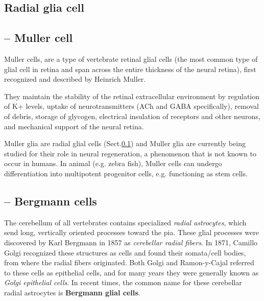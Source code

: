 \subsection{Radial glia cell}
\label{sec:Radial-glial}



\subsection{-- Muller cell}
\label{sec:Muller-cell}

 Muller cells, are a type of vertebrate retinal glial cells (the most common
 type of glial cell in retina and span across the entire thickness of the neural
 retina), first recognized and described by Heinrich Muller.
 
They maintain the stability of the retinal extracellular environment by
regulation of K+ levels, uptake of neurotransmitters (ACh and GABA
specifically), removal of debris, storage of glycogen, electrical insulation of
receptors and other neurons, and mechanical  support of the neural retina.

Muller glia are radial glial cells (Sect.\ref{sec:Radial-glial}) and Muller glia
are currently being studied for their role in neural regeneration, a phenomenon
that is not known to occur in humans. In animal (e.g. zebra fish), Muller cells
can undergo differentiation into multipotent progenitor cells, e.g.
functioning as stem cells.

\subsection{-- Bergmann cells}
\label{sec:Bergmann-cells}


\begin{mdframed}

The cerebellum of all vertebrates contains specialized {\it radial astrocytes},
which send long, vertically oriented processes toward the pia. These glial
processes were discovered by Karl Bergmann in 1857 as {\it cerebellar radial
fibers}.
In 1871, Camillo Golgi recognized these structures as cells and found their
somata/cell bodies, from where the radial fibers originated. Both Golgi and
Ramon-y-Cajal referred to these cells as epithelial cells, and for many years
they were generally known as {\it Golgi epithelial cells}. In recent times, the
common name for these cerebellar radial astrocytes is {\bf Bergmann glial
cells}.
\end{mdframed}

